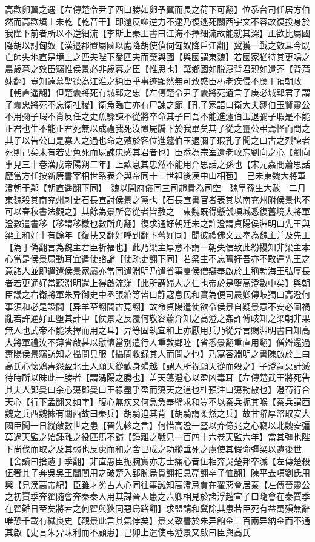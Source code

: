 高歡卵翼之遇【左傳楚令尹子西曰勝如卵予翼而長之荷下可翻】位忝台司任居方伯然而高歡墳土未乾【乾音干】即還反噬逆力不逮乃復逃死關西宇文不容故復投身於我陛下前者所以不逆細流【李斯上秦王書曰江海不擇細流故能就其深】正欲比屬國降胡以討匈奴【漢邉郡置屬國以處降胡使偵伺匈奴降戶江翻】冀獲一戰之效耳今既亡師失地直是境上之匹夫陛下愛匹夫而棄與國【與國謂東魏】若國家猶待其更鳴之晨歲暮之效臣竊惟侯景必非歲暮之臣【惟思也】棄鄉國如脱屣背君親如遺芥【背蒲妹翻】豈知遠慕聖德為江淮之純臣乎事迹顯然無可致惑臣朽老疾侵不應干預朝政【朝直遥翻】但楚囊將死有城郢之忠【左傳楚令尹子囊將死遺言子庚必城郢君子謂子囊忠將死不忘衛社稷】衛魚臨亡亦有尸諫之節【孔子家語曰衛大夫蘧伯玉賢靈公不用彌子瑕不肖反任之史魚驟諫不從將卒命其子曰吾不能進蘧伯玉退彌子瑕是不能正君也生不能正君死無以成禮我死汝置屍牖下於我畢矣其子從之靈公弔焉怪而問之其子以告公曰是寡人之過也命之殯於客位進蘧伯玉退彌子瑕孔子聞之曰古之烈諫者死則己矣未有若史魚死而屍諫忠感其君者也】臣忝為宗室遺老敢忘劉向之心【劉向事見三十卷漢成帝陽朔二年】上歎息其忠然不能用介思話之孫也【宋元嘉間蕭思話歷當方任按新唐書宰相世系表介與帝同十三世祖後漢中山相苞】　己未東魏大將軍澄朝于鄴【朝直遥翻下同】　魏以開府儀同三司趙貴為司空　魏皇孫生大赦　二月東魏殺其南兖州刺史石長宣討侯景之黨也【石長宣書官者表其以南兖州附侯景也不可以春秋書法觀之】其餘為景所脅從者皆赦之　東魏既得懸瓠項城悉復舊境大將軍澄數遣書移【移謂移檄也數所角翻】復求通好朝廷未之許澄謂貞陽侯淵明曰先王與梁主和好十有餘年【復扶又翻好呼到翻下舊好同】聞彼禮佛文云奉為魏主并及先王【為于偽翻言為魏主君臣祈福也】此乃梁主厚意不謂一朝失信致此紛擾知非梁主本心當是侯景扇動耳宜遣使諮論【使疏吏翻下同】若梁主不忘舊好吾亦不敢違先王之意諸人並即遣還侯景家屬亦當同遣淵明乃遣省事夏侯僧辯奉啟於上稱勃海王弘厚長者若更通好當聽淵明還上得啟流涕【此所謂婦人之仁也帝於是堕高澄數中矣】與朝臣議之右衛將軍朱异御史中丞張綰等皆曰静寇息民和實為便司農卿傳岐獨曰高澄何事須和必是設間【异羊至翻間古莧翻】故命貞陽遣使欲令侯景自疑景意不安必圖禍亂若許通好正堕其計中【侯景之反覆何敬容蕭介知之高澄之姦詐傅岐知之梁朝非果無人也武帝不能决擇而用之耳】异等固執宜和上亦厭用兵乃從异言賜淵明書曰知高大將軍禮汝不薄省啟甚以慰懷當别遣行人重敦鄰睦【省悉景翻重直用翻】僧辯還過夀陽侯景竊訪知之攝問具服【攝問收録其人而問之也】乃寫荅淵明之書陳啟於上曰高氏心懷鴆毒怨盈北土人願天從歡身殞越【謂人所祝願天從而殺之】子澄嗣惡計滅待時所以昧此一勝者【謂渦陽之勝也】盖天蕩澄心以盈凶毒耳【左傳楚武王將死告其夫人鄧曼曰余心蕩鄧曼曰王禄盡乎盈而蕩天之道也杜預注曰蕩動散也】澄苟行合天心【行下孟翻又如字】腹心無疾又何急急奉璧求和豈不以秦兵扼其喉【秦兵謂西魏之兵西魏據有關西故曰秦兵】胡騎迫其背【胡騎謂柔然之兵】故甘辭厚幣取安大國臣聞一日縱敵數世之患【晉先軫之言】何惜高澄一豎以弃億兆之心竊以北魏安彊莫過天監之始鍾離之役匹馬不歸【鍾離之戰見一百四十六卷天監六年】當其彊也陛下尚伐而取之及其弱也反慮而和之舍已成之功縱垂死之虜使其假命彊梁以遺後世【舍讀曰捨遺于季翻】非直愚臣扼腕實亦志士痛心昔伍相奔吳楚邦卒滅【左傳楚殺伍奢其子奔吳吳王闔閭用之破楚入郢腕烏貫翻相息亮翻卒子恤翻】陳平去項劉氏用興【見漢高帝紀】臣雖才劣古人心同往事誠知高澄忌賈在翟惡會居秦【左傳晉靈公之初賈季奔翟随會奔秦秦人用其謀晉人患之六卿相見於諸浮趙宣子曰隨會在秦賈季在翟難日至矣將若之何翟與狄同惡烏路翻】求盟請和冀除其患若臣死有益萬殞無辭唯恐千載有穢良史【觀景此言其氣悖矣】景又致書於朱异餉金三百兩异納金而不通其啟【史言朱异昧利而不顧患】己卯上遣使弔澄景又啟曰臣與高氏